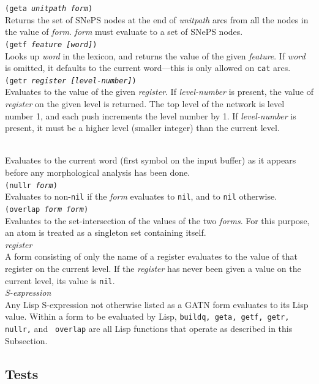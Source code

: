 \documentclass{book}
\begin{document}
\noindent
{\tt (geta {\it unitpath form})} \\ Returns the set of SNePS nodes at the end of {\it unitpath}
arcs from all the nodes in the value of {\it form}.  {\it form} must evaluate to a set of SNePS
nodes.  \\[2ex]
{\tt (getf {\it feature [word]\/})} \\  Looks up {\it word} in the lexicon, and returns the value of
the given {\it feature}.  If {\it word} is omitted, it defaults to the current word---this is only
allowed on {\tt cat} arcs. \\[2ex]
{\tt (getr {\it register [level-number]\/})} \\ Evaluates to the value of the given {\it register}.
If {\it level-number} is present, the value of {\it register} on the given level is returned.  The
top level of the network is level number 1, and each push increments the level number by 1.  If {\it
level-number} is present, it must be a higher level (smaller integer) than the current level.

\pagebreak
{} \\ Evaluates to the current word (first symbol on the input buffer) as it appears before
any morphological analysis has been done. \\[2ex]
{\tt (nullr {\it form})} \\ Evaluates to non-{\tt nil} if the {\it form} evaluates to {\tt nil}, and
to {\tt nil} otherwise.  \\[2ex]
{\tt (overlap {\it form form})} \\ Evaluates to the set-intersection of the values of the two {\it
forms}.  For this purpose, an atom is treated as a singleton set containing itself.  \\[2ex]
{\it register} \\ A form consisting of only the name of a register evaluates to the value of that
register on the current level.  If the {\it register} has never been given a value on the current
level, its value is {\tt nil}. \\[2ex]
{\it S-expression} \\ Any Lisp S-expression not otherwise listed as a GATN form evaluates to its
Lisp value.  Within a form to be evaluated by Lisp, {\tt buildq, geta, getf, getr, nullr,} and {\tt
overlap} are all Lisp functions that operate as described in this Subsection.

\subsection{Tests}
\end{document}

